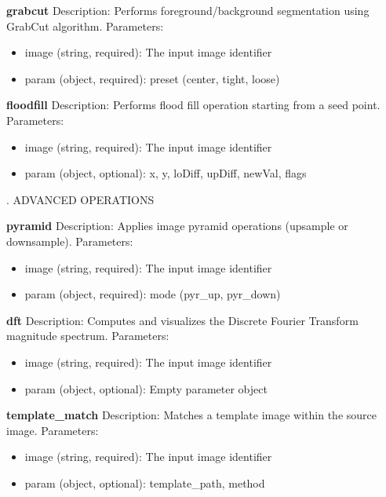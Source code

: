 \documentclass[runningheads]{llncs}
\begin{document}
\begin{tcolorbox}
\noindent \textbf{grabcut}
\newline Description: Performs foreground/background segmentation using GrabCut algorithm.
\newline Parameters:
\begin{itemize}
    \item image (string, required): The input image identifier
    \item param (object, required): preset (center, tight, loose)
\end{itemize}

\noindent \textbf{floodfill}
\newline Description: Performs flood fill operation starting from a seed point.
\newline Parameters:
\begin{itemize}
    \item image (string, required): The input image identifier
    \item param (object, optional): x, y, loDiff, upDiff, newVal, flags
\end{itemize}

\vspace{4mm}
. ADVANCED OPERATIONS
\vspace{2mm}

\noindent \textbf{pyramid}
\newline Description: Applies image pyramid operations (upsample or downsample).
\newline Parameters:
\begin{itemize}
    \item image (string, required): The input image identifier
    \item param (object, required): mode (pyr\_up, pyr\_down)
\end{itemize}

\noindent \textbf{dft}
\newline Description: Computes and visualizes the Discrete Fourier Transform magnitude spectrum.
\newline Parameters:
\begin{itemize}
    \item image (string, required): The input image identifier
    \item param (object, optional): Empty parameter object
\end{itemize}

\noindent \textbf{template\_match}
\newline Description: Matches a template image within the source image.
\newline Parameters:
\begin{itemize}
    \item image (string, required): The input image identifier
    \item param (object, optional): template\_path, method
\end{itemize}


\end{tcolorbox}
\end{document}
